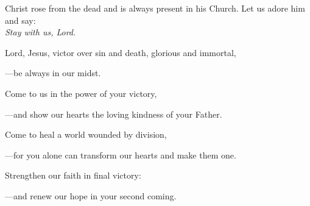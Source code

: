 \intercessions\indent

\begin{hangpar}

Christ rose from the dead and is always present in his Church. Let us adore him and say:\\
\emph{Stay with us, Lord.}

\medskip Lord, Jesus, victor over sin and death, glorious and immortal,

{\color{red}---\thinspace}be always in our midst.

\medskip Come to us in the power of your victory,

{\color{red}---\thinspace}and show our hearts the loving kindness of your Father.

\medskip Come to heal a world wounded by division,

{\color{red}---\thinspace}for you alone can transform our hearts and make them one.

\medskip Strengthen our faith in final victory:

{\color{red}---\thinspace}and renew our hope in your second coming.

\end{hangpar}

